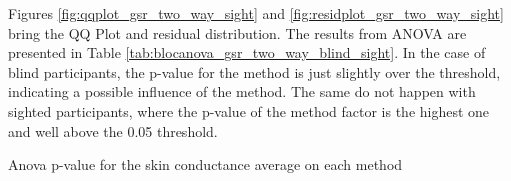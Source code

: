 Figures \ref{fig:qqplot_gsr_two_way_sight} and \ref{fig:residplot_gsr_two_way_sight} bring the QQ Plot and residual distribution. The results from ANOVA are presented in Table \ref{tab:blocanova_gsr_two_way_blind_sight}. In the case of blind participants, the p-value for the method is just slightly over the threshold, indicating a possible influence of the method. The same do not happen with sighted participants, where the p-value of the method factor is the highest one and well above the 0.05 threshold.
 
%
%

\begin{table}
    \caption{Anova p-value for the skin conductance average on each method}
    \label{tab:blocanova_gsr_two_way_blind_sight}
\begin{minipage}{0.45\textwidth}
    
\end{minipage}
\begin{minipage}{0.45\textwidth}
    
\end{minipage}
\end{table}

